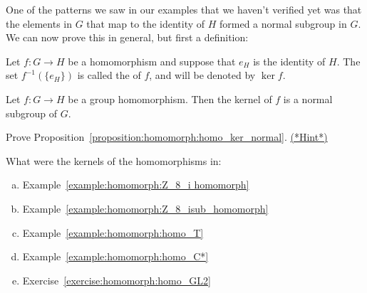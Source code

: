 \medskip

One of the patterns we saw in our examples that we haven't verified yet was that the elements in $G$ that map to the identity of $H$ formed a normal subgroup in $G$.  We can now prove this in general, but first a definition:
 
\begin{defn}\label{def:kernel} 
Let $f : G \rightarrow H$ be a  homomorphism and suppose that
$e_H$ is the identity of $H$. 
The set  $f^{-1} ( \{ e_H \})$ is  called the  of $f$, and will
be denoted by $\ker f$\label{kernelofphi}. 
\end{defn}
 
 
\begin{prop}\label{proposition:homomorph:homo_ker_normal}
Let $f : G \rightarrow H$ be a group homomorphism. Then the kernel
of $f$ is a normal subgroup of $G$. 
\end{prop}

\begin{exercise}\label{exercise:homomorph:hker}
Prove Proposition~\ref{proposition:homomorph:homo_ker_normal}. 
\hyperref[sec:homomorph:hints]{(*Hint*)} 
\end{exercise}

\begin{exercise}\label{exercise:homomorph:ker_review}
What were the kernels of the homomorphisms in:
\begin{enumerate}[(a)]
\item
Example~\ref{example:homomorph:Z_8_i homomorph}
\item
Example~\ref{example:homomorph:Z_8_isub_homomorph}
\item
Example~\ref{example:homomorph:homo_T}
\item
Example~\ref{example:homomorph:homo_C*}
\item
Exercise~\ref{exercise:homomorph:homo_GL2}
\end{enumerate}
\end{exercise} 
 
 
